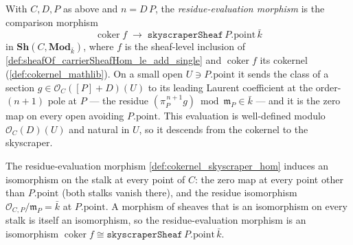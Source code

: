 \begin{definition}
  \label{def:cokernel_skyscraper_hom}
  With \(C, D, P\) as above and \(n = D\,P\), the \emph{residue-evaluation
  morphism} is the comparison morphism
  \[
    \operatorname{coker} f \;\longrightarrow\;
    \texttt{skyscraperSheaf}\,P.\mathrm{point}\,\bar k
  \]
  in \(\mathbf{Sh}(C, \mathbf{Mod}_{\bar k})\), where \(f\) is the sheaf-level
  inclusion of \cref{def:sheafOf_carrierSheafHom_le_add_single} and
  \(\operatorname{coker} f\) its cokernel (\cref{def:cokernel_mathlib}). On a
  small open \(U \ni P.\mathrm{point}\) it sends the class of a section
  \(g \in \mathcal O_C([P]+D)(U)\) to its leading Laurent coefficient at the
  order-\((n+1)\) pole at \(P\) --- the residue
  \((\pi_P^{\,n+1} g) \bmod \mathfrak m_P \in \bar k\) --- and it is the zero map
  on every open avoiding \(P.\mathrm{point}\). This evaluation is well-defined
  modulo \(\mathcal O_C(D)(U)\) and natural in \(U\), so it descends from the
  cokernel to the skyscraper.
\end{definition}

\begin{lemma}
  \label{lem:cokernel_skyscraper_hom_isIso}
  The residue-evaluation morphism \cref{def:cokernel_skyscraper_hom} induces an
  isomorphism on the stalk at every point of \(C\): the zero map at every point
  other than \(P.\mathrm{point}\) (both stalks vanish there), and the residue
  isomorphism \(\mathcal O_{C,P}/\mathfrak m_P = \bar k\) at
  \(P.\mathrm{point}\). A morphism of sheaves that is an isomorphism on every
  stalk is itself an isomorphism, so the residue-evaluation morphism is an
  isomorphism
  \(\operatorname{coker} f \cong
  \texttt{skyscraperSheaf}\,P.\mathrm{point}\,\bar k\).
\end{lemma}

